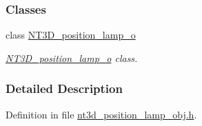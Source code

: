 \subsubsection*{Classes}
\begin{DoxyCompactItemize}
\item 
class \hyperlink{class_n_t3_d__position__lamp__o}{NT3D\_\-position\_\-lamp\_\-o}
\begin{DoxyCompactList}\small\item\em \hyperlink{class_n_t3_d__position__lamp__o}{NT3D\_\-position\_\-lamp\_\-o} class. \item\end{DoxyCompactList}\end{DoxyCompactItemize}


\subsubsection{Detailed Description}


Definition in file \hyperlink{nt3d__position__lamp__obj_8h_source}{nt3d\_\-position\_\-lamp\_\-obj.h}.


